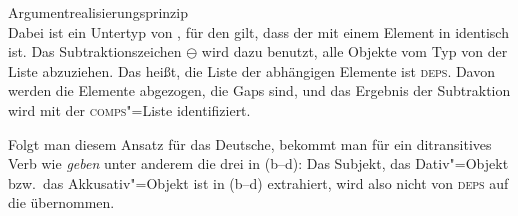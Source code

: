 \eas
Argumentrealisierungsprinzip \citep*[]{BMS2001a}\\
 \impl {} 
\zs
Dabei ist  ein Untertyp von , für den gilt, dass der \localw mit einem
Element in \slasch identisch ist. Das Subtraktionszeichen $\ominus$\is{$\ominus$}\isrel{$\ominus$} wird dazu benutzt, alle Objekte
vom Typ  von der Liste  abzuziehen. Das heißt, die Liste der abhängigen
Elemente ist \textsc{deps}. Davon werden die Elemente abgezogen, die Gaps sind, und das Ergebnis der Subtraktion wird mit der
\textsc{comps}"=Liste identifiziert.


Folgt man diesem Ansatz für das Deutsche, bekommt man für ein ditransitives Verb wie \emph{geben} 
unter anderem die drei \compslen in (b--d):
\eal
\ex {}
\ex {}
\ex {}
\ex {}
\zl
Das Subjekt, das Dativ"=Objekt bzw.\ das Akkusativ"=Objekt ist in (b--d) extrahiert, wird
also nicht von \textsc{deps} auf die \compsl übernommen.

